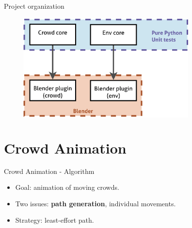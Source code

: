 \documentclass{beamer}
\begin{document}
\begin{frame}{Project organization}
  \begin{figure}
    \begin{center}
      \includegraphics[width=9cm]{orga.pdf}
    \end{center}
  \end{figure}
\end{frame}


\section{Crowd Animation}
\begin{frame}{Crowd Animation - Algorithm}
\begin{itemize}
  \item Goal: animation of moving crowds.
  \item Two issues: \textbf{path generation}, individual movements.
  \item Strategy: least-effort path.
\end{itemize}



\begin{figure}[h!]
  \centering
  \scalebox{.45}{}
\end{figure}



   
\end{frame}
\end{document}

